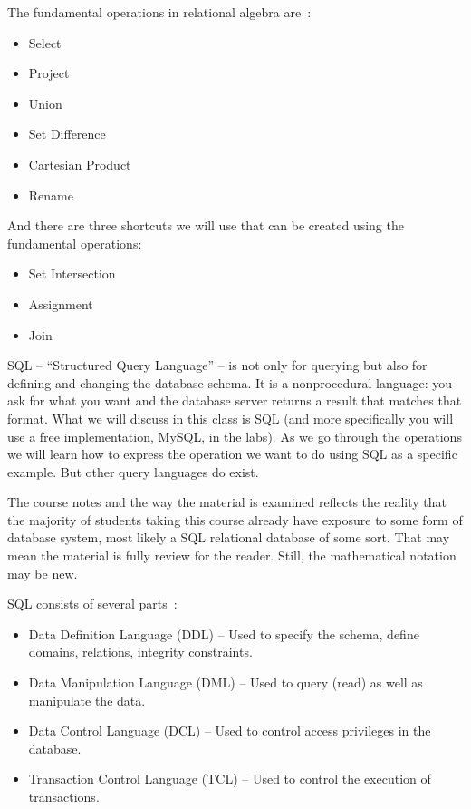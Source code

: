 \documentclass[a4paper]{report}
\begin{document}
The fundamental operations in relational algebra are~\cite{dsc}:
\begin{itemize}
	\item Select
	\item Project
	\item Union
	\item Set Difference
	\item Cartesian Product
	\item Rename
\end{itemize}

And there are three shortcuts we will use that can be created using the fundamental operations: 

\begin{itemize}
	\item Set Intersection
	\item Assignment
	\item Join
\end{itemize}

SQL -- ``Structured Query Language'' -- is not only for querying but also for defining and changing the database schema. It is a nonprocedural language: you ask for what you want and the database server returns a result that matches that format. What we will discuss in this class is SQL (and more specifically you will use a free implementation, MySQL, in the labs). As we go through the operations we will learn how to express the operation we want to do using SQL as a specific example. But other query languages do exist.

The course notes and the way the material is examined reflects the reality that the majority of students taking this course already have exposure to some form of database system, most likely a SQL relational database of some sort. That may mean the material is fully review for the reader. Still, the mathematical notation may be new.

SQL consists of several parts~\cite{dsc}:
\begin{itemize}
	\item Data Definition Language (DDL) -- Used to specify the schema, define domains, relations, integrity constraints.
	\item Data Manipulation Language (DML) -- Used to query (read) as well as manipulate the data.
	\item Data Control Language (DCL) -- Used to control access privileges in the database. 
	\item Transaction Control Language (TCL) -- Used to control the execution of transactions.
\end{itemize}
\end{document}
